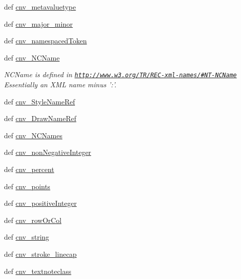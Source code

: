 \begin{DoxyCompactItemize}
\item 
def \hyperlink{namespaceodf_1_1attrconverters_a4a9a41ce0c33aa08db57e3f68077cfba}{cnv\+\_\+metavaluetype}
\item 
def \hyperlink{namespaceodf_1_1attrconverters_a1e3f571e483f75017987c0dfb501acf0}{cnv\+\_\+major\+\_\+minor}
\item 
def \hyperlink{namespaceodf_1_1attrconverters_a5e054049f615c37c24134589160af0e3}{cnv\+\_\+namespaced\+Token}
\item 
def \hyperlink{namespaceodf_1_1attrconverters_a62253f3e9de2349089df28cc66b27a07}{cnv\+\_\+\+N\+C\+Name}
\begin{DoxyCompactList}\small\item\em N\+C\+Name is defined in \href{http://www.w3.org/TR/REC-xml-names/#NT-NCName}{\tt http\+://www.\+w3.\+org/\+T\+R/\+R\+E\+C-\/xml-\/names/\#\+N\+T-\/\+N\+C\+Name} Essentially an X\+M\+L name minus '\+:'. \end{DoxyCompactList}\item 
def \hyperlink{namespaceodf_1_1attrconverters_a20017beeb1514762702703c37e09c2da}{cnv\+\_\+\+Style\+Name\+Ref}
\item 
def \hyperlink{namespaceodf_1_1attrconverters_a1ccd5fffcfde11b257c3c9300adc31ce}{cnv\+\_\+\+Draw\+Name\+Ref}
\item 
def \hyperlink{namespaceodf_1_1attrconverters_a8559714891f5698310fe98661760c560}{cnv\+\_\+\+N\+C\+Names}
\item 
def \hyperlink{namespaceodf_1_1attrconverters_a6de0ebe883bd91d8328150e29b6d1883}{cnv\+\_\+non\+Negative\+Integer}
\item 
def \hyperlink{namespaceodf_1_1attrconverters_aac11979c1416aabac74a65e5ba0725a0}{cnv\+\_\+percent}
\item 
def \hyperlink{namespaceodf_1_1attrconverters_a27d9ea13a2e1a5add722743f1fa756f5}{cnv\+\_\+points}
\item 
def \hyperlink{namespaceodf_1_1attrconverters_a29b8e7d897025f975c135179d5cf7321}{cnv\+\_\+positive\+Integer}
\item 
def \hyperlink{namespaceodf_1_1attrconverters_aea7dfa16c558fceaa163879ee587cce8}{cnv\+\_\+row\+Or\+Col}
\item 
def \hyperlink{namespaceodf_1_1attrconverters_a072f568e8950c53f5a4a6912a5ca175c}{cnv\+\_\+string}
\item 
def \hyperlink{namespaceodf_1_1attrconverters_a9e734cce61f54f6cf18a9e14b485cbd1}{cnv\+\_\+stroke\+\_\+linecap}
\item 
def \hyperlink{namespaceodf_1_1attrconverters_a332c61e3ebc751ae0d2204fe011d687b}{cnv\+\_\+textnoteclass}

\end{DoxyCompactItemize}
